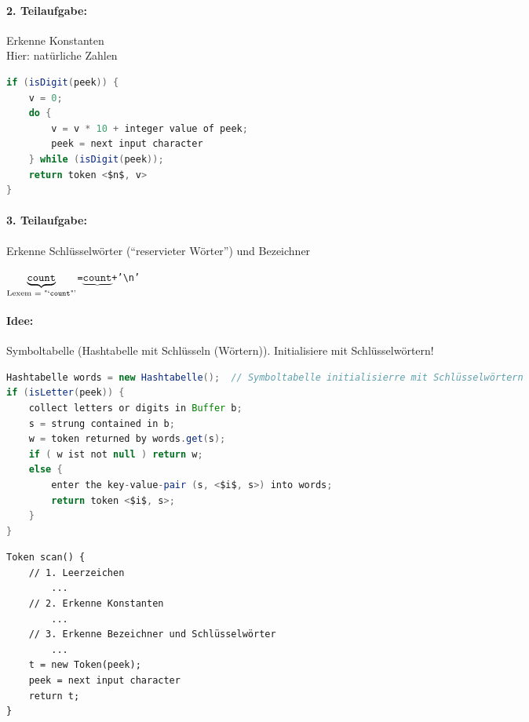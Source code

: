 \paragraph{2. Teilaufgabe:} Erkenne Konstanten\\
Hier: natürliche Zahlen
\begin{lstlisting}[language=Java,mathescape=True]
if (isDigit(peek)) {
    v = 0;
    do {
        v = v * 10 + integer value of peek;
        peek = next input character
    } while (isDigit(peek));
    return token <$n$, v>
}
\end{lstlisting}

\paragraph{3. Teilaufgabe:} Erkenne Schlüsselwörter ("`reservieter Wörter"') und Bezeichner
\begin{center}
\texttt{\dq\textvisiblespace\textvisiblespace\textvisiblespace  $\underbrace{\texttt{count}}_{\text{Lexem = "`\texttt{count}"'}}$\textvisiblespace\textvisiblespace=\textvisiblespace $\underbrace{\texttt{count}}$\textvisiblespace +'\textbackslash n'\dq}
\end{center}
\paragraph{Idee:} Symboltabelle (Hashtabelle mit Schlüsseln (Wörtern)). Initialisiere mit Schlüsselwörtern!
\begin{lstlisting}[language=Java,mathescape=True]
Hashtabelle words = new Hashtabelle();  // Symboltabelle initialisierre mit Schlüsselwörtern
if (isLetter(peek)) {
    collect letters or digits in Buffer b;
    s = strung contained in b;
    w = token returned by words.get(s);
    if ( w ist not null ) return w;
    else {
        enter the key-value-pair (s, <$i$, s>) into words;
        return token <$i$, s>;
    }
}
\end{lstlisting}
\begin{lstlisting}
Token scan() {
    // 1. Leerzeichen
        ...
    // 2. Erkenne Konstanten
        ...
    // 3. Erkenne Bezeichner und Schlüsselwörter
        ...
    t = new Token(peek);
    peek = next input character
    return t;
}
\end{lstlisting}
